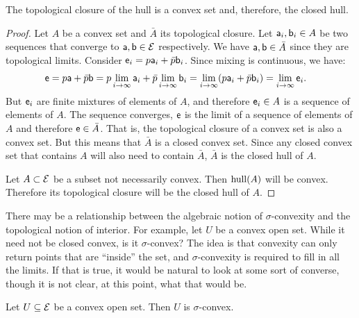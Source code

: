 \begin{mathSection}
\begin{prop}
	The topological closure of the hull is a convex set and, therefore, the closed hull.
\end{prop}

\begin{proof}
	Let $A$ be a convex set and $\bar{A}$ its topological closure. Let $\ens[a]_i, \ens[b]_i \in A$ be two sequences that converge to $\ens[a], \ens[b] \in \Ens$ respectively. We have $\ens[a], \ens[b] \in \bar{A}$ since they are topological limits. Consider $\ens_i = p \ens[a]_i + \bar{p} \ens[b]_i$. Since mixing is continuous, we have:
	\begin{equation}
		\begin{aligned}
			\ens &= p \ens[a] + \bar{p} \ens[b] = p \lim\limits_{i \to \infty} \ens[a]_i + \bar{p} \lim\limits_{i \to \infty} \ens[b]_i = \lim\limits_{i \to \infty} (p \ens[a]_i + \bar{p} \ens[b]_i) = \lim\limits_{i \to \infty} \ens_i.
		\end{aligned}
	\end{equation}
	But $\ens_i$ are finite mixtures of elements of $A$, and therefore $\ens_i \in A$ is a sequence of elements of $A$. The sequence converges, $\ens$ is the limit of a sequence of elements of $A$ and therefore $\ens \in \bar{A}$. That is, the topological closure of a convex set is also a convex set. But this means that $\bar{A}$ is a closed convex set. Since any closed convex set that contains $A$ will also need to contain $\bar{A}$, $\bar{A}$ is the closed hull of $A$.

	Let $A \subset \Ens$ be a subset not necessarily convex. Then $\hull(A)$ will be convex. Therefore its topological closure will be the closed hull of $A$.
\end{proof}
\end{mathSection}

There may be a relationship between the algebraic notion of $\sigma$-convexity and the topological notion of interior. For example, let $U$ be a convex open set. While it need not be closed convex, is it $\sigma$-convex? The idea is that convexity can only return points that are ``inside'' the set, and $\sigma$-convexity is required to fill in all the limits. If that is true, it would be natural to look at some sort of converse, though it is not clear, at this point, what that would be.

\begin{conj}
	Let $U \subseteq \Ens$ be a convex open set. Then $U$ is $\sigma$-convex.
\end{conj}

